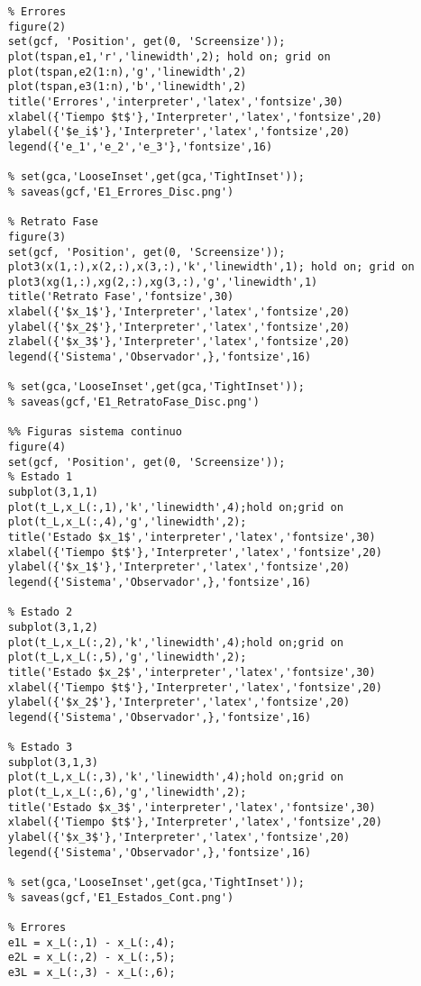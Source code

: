 \begin{verbatim}
	% Errores
	figure(2)
	set(gcf, 'Position', get(0, 'Screensize'));
	plot(tspan,e1,'r','linewidth',2); hold on; grid on
	plot(tspan,e2(1:n),'g','linewidth',2)
	plot(tspan,e3(1:n),'b','linewidth',2)
	title('Errores','interpreter','latex','fontsize',30)
	xlabel({'Tiempo $t$'},'Interpreter','latex','fontsize',20)
	ylabel({'$e_i$'},'Interpreter','latex','fontsize',20)
	legend({'e_1','e_2','e_3'},'fontsize',16)
	
	% set(gca,'LooseInset',get(gca,'TightInset'));
	% saveas(gcf,'E1_Errores_Disc.png')
	
	% Retrato Fase
	figure(3)
	set(gcf, 'Position', get(0, 'Screensize'));
	plot3(x(1,:),x(2,:),x(3,:),'k','linewidth',1); hold on; grid on
	plot3(xg(1,:),xg(2,:),xg(3,:),'g','linewidth',1)
	title('Retrato Fase','fontsize',30)
	xlabel({'$x_1$'},'Interpreter','latex','fontsize',20)
	ylabel({'$x_2$'},'Interpreter','latex','fontsize',20)
	zlabel({'$x_3$'},'Interpreter','latex','fontsize',20)
	legend({'Sistema','Observador',},'fontsize',16)
	
	% set(gca,'LooseInset',get(gca,'TightInset'));
	% saveas(gcf,'E1_RetratoFase_Disc.png')
	
	%% Figuras sistema continuo
	figure(4)
	set(gcf, 'Position', get(0, 'Screensize'));
	% Estado 1
	subplot(3,1,1)
	plot(t_L,x_L(:,1),'k','linewidth',4);hold on;grid on
	plot(t_L,x_L(:,4),'g','linewidth',2);
	title('Estado $x_1$','interpreter','latex','fontsize',30)
	xlabel({'Tiempo $t$'},'Interpreter','latex','fontsize',20)
	ylabel({'$x_1$'},'Interpreter','latex','fontsize',20)
	legend({'Sistema','Observador',},'fontsize',16)
	
	% Estado 2
	subplot(3,1,2)
	plot(t_L,x_L(:,2),'k','linewidth',4);hold on;grid on
	plot(t_L,x_L(:,5),'g','linewidth',2);
	title('Estado $x_2$','interpreter','latex','fontsize',30)
	xlabel({'Tiempo $t$'},'Interpreter','latex','fontsize',20)
	ylabel({'$x_2$'},'Interpreter','latex','fontsize',20)
	legend({'Sistema','Observador',},'fontsize',16)
	
	% Estado 3
	subplot(3,1,3)
	plot(t_L,x_L(:,3),'k','linewidth',4);hold on;grid on
	plot(t_L,x_L(:,6),'g','linewidth',2);
	title('Estado $x_3$','interpreter','latex','fontsize',30)
	xlabel({'Tiempo $t$'},'Interpreter','latex','fontsize',20)
	ylabel({'$x_3$'},'Interpreter','latex','fontsize',20)
	legend({'Sistema','Observador',},'fontsize',16)
	
	% set(gca,'LooseInset',get(gca,'TightInset'));
	% saveas(gcf,'E1_Estados_Cont.png')
	
	% Errores
	e1L = x_L(:,1) - x_L(:,4);
	e2L = x_L(:,2) - x_L(:,5);
	e3L = x_L(:,3) - x_L(:,6);
	

\end{verbatim}
